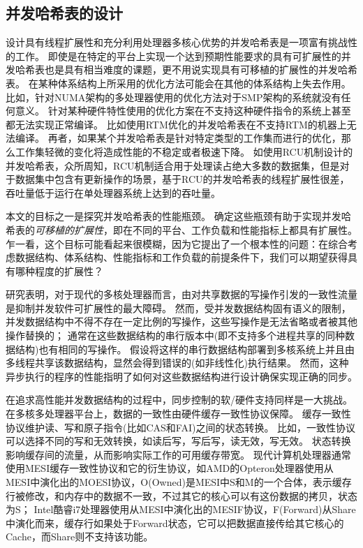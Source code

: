\subsection{并发哈希表的设计}
设计具有线程扩展性和充分利用处理器多核心优势的并发哈希表是一项富有挑战性的工作。
即使是在特定的平台上实现一个达到预期性能要求的具有可扩展性的并发哈希表也是具有相当难度的课题，更不用说实现具有可移植的扩展性的并发哈希表。
在某种体系结构上所采用的优化方法可能会在其他的体系结构上失去作用\cite{baumann2009multikernel,david}。
比如，针对NUMA架构的多处理器使用的优化方法对于SMP架构的系统就没有任何意义\cite{david}。
针对某种硬件特性使用的优化方案在不支持这种硬件指令的系统上甚至都无法实现正常编译。
比如使用RTM优化的并发哈希表在不支持RTM的机器上无法编译。
再者，如果某个并发哈希表是针对特定类型的工作集而进行的优化，那么工作集轻微的变化将造成性能的不稳定或者极速下降。
如使用RCU机制设计的并发哈希表，众所周知，RCU机制适合用于处理读占绝大多数的数据集，但是对于数据集中包含有更新操作的场景，基于RCU的并发哈希表的线程扩展性很差，吞吐量低于运行在单处理器系统上达到的吞吐量\cite{urcu}。

本文的目标之一是探究并发哈希表的性能瓶颈。
确定这些瓶颈有助于实现并发哈希表的\textit{可移植的扩展性}，即在不同的平台、工作负载和性能指标上都具有扩展性。
乍一看，这个目标可能看起来很模糊，因为它提出了一个根本性的问题：在综合考虑数据结构、体系结构、性能指标和工作负载的前提条件下，我们可以期望获得具有哪种程度的扩展性？

研究表明，对于现代的多核处理器而言，由对共享数据的写操作引发的一致性流量是抑制并发软件可扩展性的最大障碍。
然而，受并发数据结构固有语义的限制，并发数据结构中不得不存在一定比例的写操作，这些写操作是无法省略或者被其他操作替换的；
通常在这些数据结构的串行版本中(即不支持多个进程共享的同种数据结构)也有相同的写操作。
假设将这样的串行数据结构部署到多核系统上并且由多线程共享该数据结构，显然会得到错误的(如非线性化\cite{herlihy1990linearizability})执行结果。
然而，这种异步执行的程序的性能指明了如何对这些数据结构进行设计确保实现正确的同步。

在追求高性能并发数据结构的过程中，同步控制的软/硬件支持同样是一大挑战。
在多核多处理器平台上，数据的一致性由硬件缓存一致性协议保障。
缓存一致性协议维护读、写和原子指令(比如CAS和FAI)之间的状态转换。
比如，一致性协议可以选择不同的写和无效转换，如读后写，写后写，读无效，写无效。
状态转换影响缓存间的流量，从而影响实际工作的可用缓存带宽。
现代计算机处理器通常使用MESI缓存一致性协议和它的衍生协议，如AMD的Opteron处理器使用从MESI中演化出的MOESI协议，O(Owned)是MESI中S和M的一个合体，表示缓存行被修改，和内存中的数据不一致，不过其它的核心可以有这份数据的拷贝，状态为S；
Intel酷睿i7处理器使用从MESI中演化出的MESIF协议，F(Forward)从Share中演化而来，缓存行如果处于Forward状态，它可以把数据直接传给其它核心的Cache，而Share则不支持该功能。

